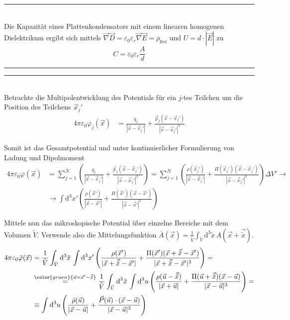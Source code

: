 \documentclass{article}
\newcommand{\diff}{\mathrm{d}}
\newcommand{\lr}[1]{\left(#1\right)}
\newcommand{\comment}[1]{{\color{gruen} {#1}}}
\begin{document}
\vspace{0.5cm}

{\color{blue}
\hrule
	\\
	Die Kapazität eines Plattenkondensators mit einem linearen homogenen Dielektrikum ergibt sich mittels $\vec{\nabla}\vec{D} = \varepsilon_0\varepsilon_r \vec{\nabla}\vec{E} = \bar{\rho}_\text{frei}$ und $U = d \cdot |\vec{E}|$ zu
		$$C = \varepsilon_0\varepsilon_r\frac{A}{d}$$
\hrule
}	


\newpage


{\color{violet}
\hrule
	\\
	Betrachte die Multipolentwicklung des Potentials für ein $j$-tes Teilchen um die Position des Teilchens $\vec{x}_j'$
		\begin{align*}
			4\pi\varepsilon_0 \varphi_j(\vec{x}) &= \frac{q_j}{|\vec{x} - \vec{x}_j'|} + \frac{\vec{p}_j (\vec{x} - \vec{x}_j') }{|\vec{x} - \vec{x}_j'|^3}
		\end{align*}

	Somit ist das Gesamtpotential und unter kontinuierlicher Formulierung von Ladung und Dipolmoment
		\begin{align*}
			4\pi\varepsilon_0 \varphi(\vec{x}) &= \sum_{j=1}^N \lr{ \frac{q_j}{|\vec{x} - \vec{x}_j'|} + \frac{\vec{p}_j (\vec{x} - \vec{x}_j') }{|\vec{x} - \vec{x}_j'|^3} } = \sum_{j=1}^N \lr{ \frac{\rho(\vec{x}_j')}{|\vec{x} - \vec{x}_j'|} + \frac{\Pi(\vec{x}_j') (\vec{x} - \vec{x}_j') }{|\vec{x} - \vec{x}_j'|^3} } \Delta V' \to \\
			&\to \int \diff^3x' \lr{ \frac{\rho(\vec{x}')}{|\vec{x} - \vec{x}'|} + \frac{\Pi(\vec{x}') (\vec{x} - \vec{x}') }{|\vec{x} - \vec{x}'|^3} }
		\end{align*}

	Mittele nun das mikroskopische Potential über einzelne Bereiche mit dem Volumen $\tilde{V}$. Verwende also die Mittelungsfunktion $\bar{A}(\vec{x}) = \frac{1}{\tilde{V}} \int_{\tilde{V}} \diff^3\tilde{x}\, A(\vec{x} + \vec{\tilde{x}})$.
		\begin{align*}
			4\pi\varepsilon_0 \bar{\varphi}(\vec{x}) &= \frac{1}{\tilde{V}} \int_{\tilde{V}} \diff^3\tilde{x}\, \int \diff^3x' \lr{ \frac{\rho(\vec{x}')}{|\vec{x} + \vec{\tilde{x}} - \vec{x}'|} + \frac{\Pi(\vec{x}') (\vec{x} + \vec{\tilde{x}} - \vec{x}') }{|\vec{x} + \vec{\tilde{x}} - \vec{x}'|^3} } = \\
			&\stackrel{\comment{\vec{u} = \vec{x}' - \vec{\tilde{x}}}}{=} \frac{1}{\tilde{V}} \int_{\tilde{V}} \diff^3\tilde{x}\, \int \diff^3u \lr{ \frac{\rho(\vec{u} - \vec{\tilde{x}})}{|\vec{x} + \vec{u}|} + \frac{\Pi(\vec{u} + \vec{\tilde{x}}) (\vec{x} - \vec{u}) }{|\vec{x} - \vec{u}|^3} } = \\
			&\equiv \int \diff^3u \lr{ \frac{\bar{\rho}(\vec{u})}{|\vec{x} - \vec{u}|} + \frac{\vec{P}(\vec{u}) \cdot (\vec{x} - \vec{u})}{|\vec{x} - \vec{u}|^3}}
		\end{align*}
	
}
\end{document}
